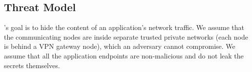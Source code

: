 \subsection{Threat Model}
\label{subsec:threat-model}

{\sys}'s goal is to hide the content of an application's network
traffic.
We assume that the communicating nodes are inside separate trusted private
networks (\eg each node is behind a VPN gateway node), which an adversary
cannot compromise. We assume that all the application endpoints are
non-malicious and do not leak the secrets themselves.

